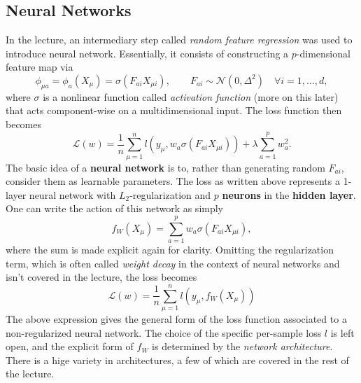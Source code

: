\documentclass{article}
\begin{document}
\subsection{Neural Networks}
In the lecture, an intermediary step called \emph{random feature regression} was used to introduce neural network. Essentially, it consists of constructing a $p$-dimensional feature map via
\begin{equation}
    \phi_{\mu a}
    =
    \phi_a (X_{\mu})
    =
    \sigma(F_{a i} X_{\mu i}), \quad\quad
    F_{a i} \sim \mathcal{N}(0,\Delta^2) \quad \forall i=1,\dots,d,
\end{equation}
where $\sigma$ is a nonlinear function called \emph{activation function} (more on this later) that acts component-wise on a multidimensional input. The loss function then becomes
\begin{equation}
    \mathcal{L}(w) =
    \frac{1}{n}\sum_{\mu = 1}^{n}
    l(y_{\mu}, w_a \sigma(F_{a i} X_{\mu i}))
    + \lambda \sum_{a=1}^{p} w_a^2.
    \label{eq:slnn_loss}
\end{equation}
The basic idea of a \textbf{neural network} is to, rather than generating random $F_{a i}$, consider them as learnable parameters. The loss as written above represents a 1-layer neural network with $L_2$-regularization and $p$ \textbf{neurons} in the \textbf{hidden layer}. One can write the action of this network as simply
\begin{equation}
    f_W(X_{\mu})
    = \sum_{a=1}^{p}
    w_a \sigma(F_{a i} X_{\mu i}),
    \label{eq:slnn_action}
\end{equation}
where the sum is made explicit again for clarity. Omitting the regularization term, which is often called \emph{weight decay} in the context of neural networks and isn't covered in the lecture, the loss becomes
\begin{equation}
    \mathcal{L}(w) =
    \frac{1}{n}\sum_{\mu = 1}^{n}
    l(y_{\mu}, f_W(X_{\mu}))
    \label{eq:nn_loss}
\end{equation}
The above expression gives the general form of the loss function associated to a non-regularized neural network. The choice of the specific per-sample loss $l$ is left open, and the explicit form of $f_W$ is determined by the \emph{network architecture}. There is a hige variety in architectures, a few of which are covered in the rest of the lecture.
\end{document}

